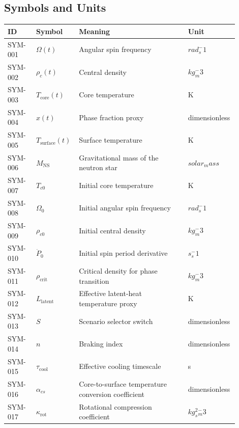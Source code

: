 \documentclass[11pt]{article}
\begin{document}
\subsection{Symbols and Units}

\begin{center}
\small
\begin{tabular}{|p{0.12\linewidth}|p{0.15\linewidth}|p{0.46\linewidth}|p{0.17\linewidth}|}
\hline
ID & Symbol & Meaning & Unit \\ \hline
SYM-001 & $\Omega(t)$ & Angular spin frequency & $rad_s^-1$ \\ \hline
SYM-002 & $\rho_c(t)$ & Central density & $kg_m^-3$ \\ \hline
SYM-003 & $T_{\mathrm{core}}(t)$ & Core temperature & K \\ \hline
SYM-004 & $x(t)$ & Phase fraction proxy & dimensionless \\ \hline
SYM-005 & $T_{\mathrm{surface}}(t)$ & Surface temperature & K \\ \hline
SYM-006 & $M_{\mathrm{NS}}$ & Gravitational mass of the neutron star & $solar_mass$ \\ \hline
SYM-007 & $T_{c0}$ & Initial core temperature & K \\ \hline
SYM-008 & $\Omega_0$ & Initial angular spin frequency & $rad_s^-1$ \\ \hline
SYM-009 & $\rho_{c0}$ & Initial central density & $kg_m^-3$ \\ \hline
SYM-010 & $\dot{P}_0$ & Initial spin period derivative & $s_s^-1$ \\ \hline
SYM-011 & $\rho_{\mathrm{crit}}$ & Critical density for phase transition & $kg_m^-3$ \\ \hline
SYM-012 & $L_{\mathrm{latent}}$ & Effective latent-heat temperature proxy & K \\ \hline
SYM-013 & $S$ & Scenario selector switch & dimensionless \\ \hline
SYM-014 & $n$ & Braking index & dimensionless \\ \hline
SYM-015 & $\tau_{\mathrm{cool}}$ & Effective cooling timescale & s \\ \hline
SYM-016 & $\alpha_{cs}$ & Core-to-surface temperature conversion coefficient & dimensionless \\ \hline
SYM-017 & $\kappa_{\mathrm{rot}}$ & Rotational compression coefficient & $kg_s^2_m^-3$ \\ \hline
\end{tabular}
\end{center}
\end{document}
